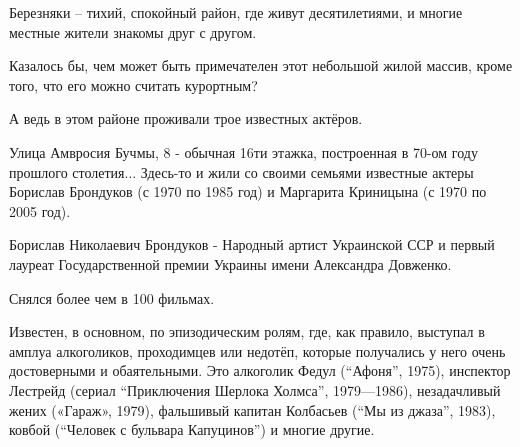 \begin{multicols}{2} %
\setlength{\parindent}{0pt}

Березняки – тихий, спокойный район, где живут десятилетиями, и многие местные
жители знакомы друг с другом.

Казалось бы, чем может быть примечателен этот небольшой жилой массив, кроме
того, что его можно считать курортным?

А ведь в этом районе проживали трое известных актёров.







Улица Амвросия Бучмы, 8 - обычная 16ти этажка, построенная в 70-ом году
прошлого столетия... Здесь-то и жили со своими семьями известные актеры
Борислав Брондуков (с 1970 по 1985 год) и Маргарита Криницына (с 1970 по 2005
год).

Борислав Николаевич Брондуков - Народный артист Украинской ССР и первый лауреат
Государственной премии Украины имени Александра Довженко. 

Снялся более чем в 100 фильмах.

Известен, в основном, по эпизодическим ролям, где, как правило, выступал в
амплуа алкоголиков, проходимцев или недотёп, которые получались у него очень
достоверными и обаятельными. Это алкоголик Федул (\enquote{Афоня}, 1975), инспектор
Лестрейд (сериал \enquote{Приключения Шерлока Холмса}, 1979—1986), незадачливый жених
(«Гараж», 1979), фальшивый капитан Колбасьев (\enquote{Мы из джаза}, 1983), ковбой
(\enquote{Человек с бульвара Капуцинов}) и многие другие.


\end{multicols}
